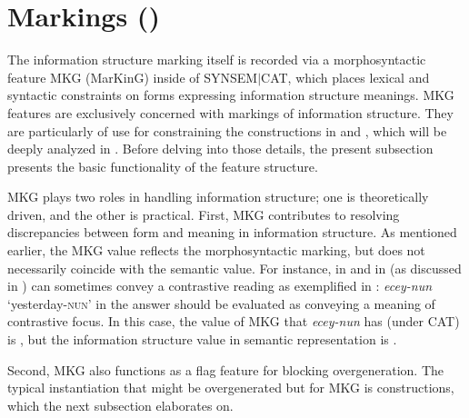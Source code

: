 \section{Markings \textnormal{(}\textnormal{)}}
\label{9:ssec:mkg}

The information structure marking itself is recorded via a
morphosyntactic feature MKG (MarKinG) inside
of \mbox{SYNSEM{$\mid$}CAT}, which places lexical and syntactic
constraints on forms expressing information structure meanings.  MKG
features are exclusively concerned with markings of information
structure. They are particularly of use for constraining the
 constructions in  and ,
which will be deeply analyzed in 
  . Before delving into those details, the
  present subsection presents the basic functionality of the feature
  structure.


MKG plays two roles in handling information structure; one is
theoretically driven, and the other is practical.  First, MKG
contributes to resolving discrepancies between form and meaning in
information structure. As mentioned earlier, the MKG value reflects
the morphosyntactic marking, but does not necessarily coincide with
the semantic value.  For instance, \wa in  and \nun in
 (as discussed in ) can sometimes convey a
contrastive  reading as exemplified in :
\textit{ecey-nun} `yesterday-\textsc{nun}' in the answer should be
evaluated as conveying a meaning of contrastive focus.  In this case,
the value of MKG that \textit{ecey-nun} has (under CAT) is ,
but the information structure value in semantic representation is
.



\noindent Second, MKG also functions as a flag feature for blocking
overgeneration.  The typical instantiation that might be overgenerated
but for MKG is  constructions, which the next
subsection elaborates on.


